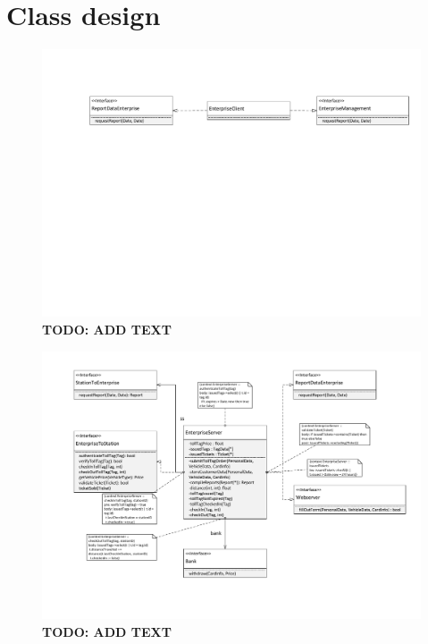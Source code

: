 \section{Class design}
\begin{figure}
\centerline{\includegraphics[width=\textwidth]{img/class_diagrams/class_diagram_enterprise_client}}
\caption{\textbf{TODO: ADD TEXT}}
\label{fig:cld_ec}
\end{figure}

\begin{figure}
\centerline{\includegraphics[width=\textwidth]{img/class_diagrams/class_diagram_enterprise_server}}
\caption{\textbf{TODO: ADD TEXT}}
\label{fig:cld_es}
\end{figure}

